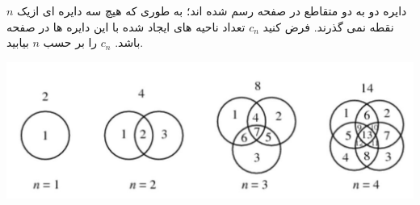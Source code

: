 \exercise
$n$
 دایره دو به دو متقاطع در صفحه رسم شده اند؛ به طوری که هیچ سه دایره ای ازیک نقطه نمی گذرند. فرض کنید 
$c_n$
 تعداد ناحیه های ایجاد شده با این دایره ها در صفحه باشد. 
$c_n$ 
 را بر حسب 
$n$
  بیابید.
  
    \begin{center}
     	\includegraphics[scale=0.3]{./4.png}
    \end{center}